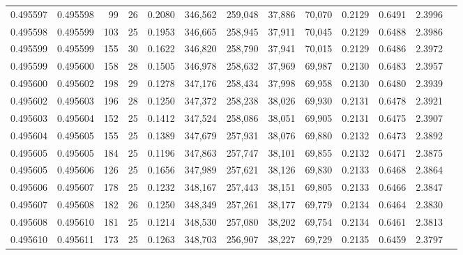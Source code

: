 \begin{tabular}{rrrrrrrrrrrrr}
0.495597 & 0.495598 &  99 &  26 &                                     0.2080 & 346,562 & 259,048 &  37,886 &  70,070 & 0.2129 & 0.6491 & 2.3996 \\
0.495598 & 0.495599 & 103 &  25 &                                     0.1953 & 346,665 & 258,945 &  37,911 &  70,045 & 0.2129 & 0.6488 & 2.3986 \\
0.495599 & 0.495599 & 155 &  30 &                                     0.1622 & 346,820 & 258,790 &  37,941 &  70,015 & 0.2129 & 0.6486 & 2.3972 \\
0.495599 & 0.495600 & 158 &  28 &                                     0.1505 & 346,978 & 258,632 &  37,969 &  69,987 & 0.2130 & 0.6483 & 2.3957 \\
0.495600 & 0.495602 & 198 &  29 &                                     0.1278 & 347,176 & 258,434 &  37,998 &  69,958 & 0.2130 & 0.6480 & 2.3939 \\
0.495602 & 0.495603 & 196 &  28 &                                     0.1250 & 347,372 & 258,238 &  38,026 &  69,930 & 0.2131 & 0.6478 & 2.3921 \\
0.495603 & 0.495604 & 152 &  25 &                                     0.1412 & 347,524 & 258,086 &  38,051 &  69,905 & 0.2131 & 0.6475 & 2.3907 \\
0.495604 & 0.495605 & 155 &  25 &                                     0.1389 & 347,679 & 257,931 &  38,076 &  69,880 & 0.2132 & 0.6473 & 2.3892 \\
0.495605 & 0.495605 & 184 &  25 &                                     0.1196 & 347,863 & 257,747 &  38,101 &  69,855 & 0.2132 & 0.6471 & 2.3875 \\
0.495605 & 0.495606 & 126 &  25 &                                     0.1656 & 347,989 & 257,621 &  38,126 &  69,830 & 0.2133 & 0.6468 & 2.3864 \\
0.495606 & 0.495607 & 178 &  25 &                                     0.1232 & 348,167 & 257,443 &  38,151 &  69,805 & 0.2133 & 0.6466 & 2.3847 \\
0.495607 & 0.495608 & 182 &  26 &                                     0.1250 & 348,349 & 257,261 &  38,177 &  69,779 & 0.2134 & 0.6464 & 2.3830 \\
0.495608 & 0.495610 & 181 &  25 &                                     0.1214 & 348,530 & 257,080 &  38,202 &  69,754 & 0.2134 & 0.6461 & 2.3813 \\
0.495610 & 0.495611 & 173 &  25 &                                     0.1263 & 348,703 & 256,907 &  38,227 &  69,729 & 0.2135 & 0.6459 & 2.3797 \\

\end{tabular}
